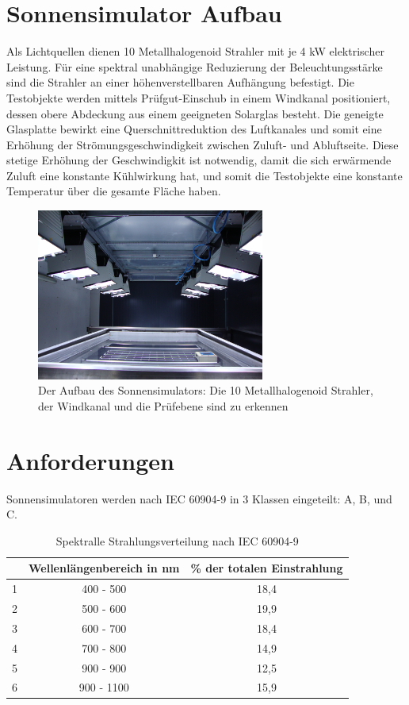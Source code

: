 \documentclass[a4paper,bibtotoc,oneside]{scrbook}
\begin{document}
\section{Sonnensimulator Aufbau}\thispagestyle{empty}
Als Lichtquellen dienen 10 Metallhalogenoid Strahler mit je 4 kW elektrischer Leistung.
Für eine spektral unabhängige Reduzierung der Beleuchtungsstärke sind die Strahler an einer höhenverstellbaren Aufhängung befestigt.
Die Testobjekte werden mittels Prüfgut-Einschub in einem Windkanal positioniert, dessen obere Abdeckung aus einem geeigneten Solarglas besteht. Die geneigte Glasplatte bewirkt eine Querschnittreduktion des Luftkanales und somit eine Erhöhung der Strömungsgeschwindigkeit zwischen Zuluft- und Abluftseite. Diese stetige Erhöhung der Geschwindigkit ist notwendig, damit die sich erwärmende Zuluft eine konstante Kühlwirkung hat, und somit die Testobjekte eine konstante Temperatur über die gesamte Fläche haben.

\begin{figure}[htbp]
\centering
\includegraphics[width=75mm]{img/sunsimulator.jpg}
\caption[Sonnensimulator]{Der Aufbau des Sonnensimulators: Die 10 Metallhalogenoid Strahler, der Windkanal und die Prüfebene sind zu erkennen}\label{sunsim}
\end{figure}


\section{Anforderungen}\thispagestyle{empty}
Sonnensimulatoren werden nach IEC 60904-9 in 3 Klassen eingeteilt: A, B, und C. 


\begin{table}[htbp]
\centering
\begin{tabular}{ | c | c | c |}\hline
{\bf } & {\bf Wellenlängenbereich in nm} & {\bf \% der totalen Einstrahlung}\\ \hline
\hline
1  & 400 - 500 & 18,4 \\ \hline
2  & 500 - 600 & 19,9\\ \hline
3  & 600 - 700 & 18,4\\ \hline
4  & 700 - 800 & 14,9\\ \hline
5  & 900 - 900 & 12,5\\ \hline
6  & 900 - 1100 & 15,9\\ \hline
\end{tabular}
\caption{Spektralle Strahlungsverteilung nach IEC 60904-9}\label{TabS1}
\end{table}
\end{document}
